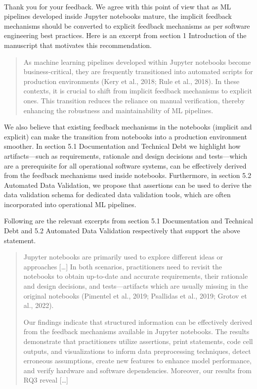 \documentclass[11pt,fleqn]{article}
\newcommand{\eline}{\vspace*{.75\baselineskip}}
\newcommand{\Us}{\eline \noindent {\bf Response:}\\}
\begin{document}
\Us Thank you for your feedback. We agree with this point of view that as ML pipelines developed inside Jupyter notebooks mature, the implicit feedback mechanisms should be converted to explicit feedback mechanisms as per software engineering best practices. Here is an excerpt from section 1 Introduction of the manuscript that motivates this recommendation.

\begin{quote}
  As machine learning pipelines developed within Jupyter notebooks become business-critical, they are frequently transitioned into automated scripts for production environments (Kery et al., 2018; Rule et al., 2018). In these contexts, it is crucial to shift from implicit feedback mechanisms to explicit ones. This transition reduces the reliance on manual verification, thereby enhancing the robustness and maintainability of ML pipelines.
\end{quote}

We also believe that existing feedback mechanisms in the notebooks (implicit and explicit) can make the transition from notebooks into a production environment smoother. In section 5.1 Documentation and Technical Debt we highlight how artifacts---such as requirements, rationale and design decisions and tests---which are a prerequisite for all operational software systems, can be effectively derived from the feedback mechanisms used inside notebooks. Furthermore, in section 5.2 Automated Data Validation, we propose that assertions can be used to derive the data validation schema for dedicated data validation tools, which are often incorporated into operational ML pipelines.

Following are the relevant excerpts from section 5.1 Documentation and Technical Debt and 5.2 Automated Data Validation respectively that support the above statement.

\begin{quote}
  Jupyter notebooks are primarily used to explore different ideas or approaches [\ldots] In both scenarios, practitioners need to revisit the notebooks to obtain up-to-date and accurate requirements, their rationale and design decisions, and tests---artifacts which are usually missing in the original notebooks (Pimentel et al., 2019; Psallidas et al., 2019; Grotov et al., 2022).

  Our findings indicate that structured information can be effectively derived from the feedback mechanisms available in Jupyter notebooks. The results demonstrate that practitioners utilize assertions, print statements, code cell outputs, and visualizations to inform data preprocessing techniques, detect erroneous assumptions, create new features to enhance model performance, and verify hardware and software dependencies. Moreover, our results from RQ3 reveal [\ldots]
\end{quote}
\end{document}
